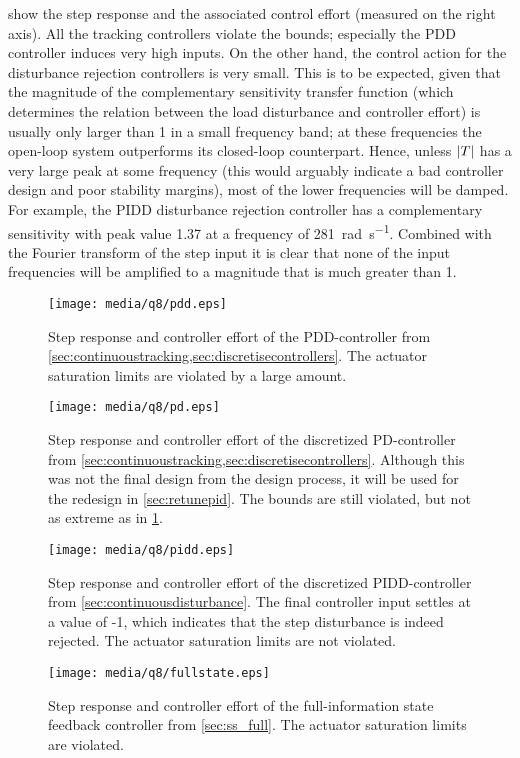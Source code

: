  show the step response and the associated control effort (measured on the right axis). All the tracking controllers violate the bounds; especially the PDD controller induces very high inputs.
On the other hand, the control action for the disturbance rejection controllers is very small. This is to be expected, given that the magnitude of the complementary sensitivity transfer function (which determines the relation between the load disturbance and controller effort) is usually only larger than 1 in a small frequency band; at these frequencies the open-loop system outperforms its closed-loop counterpart. Hence, unless $\abs{T}$ has a very large peak at some frequency (this would arguably indicate a bad controller design and poor stability margins), most of the lower frequencies will be damped. For example, the PIDD disturbance rejection controller has a complementary sensitivity with peak value 1.37 at a frequency of \SI{281}{\radian\per\second}. Combined with the Fourier transform of the step input it is clear that none of the input frequencies will be amplified to a magnitude that is much greater than 1.
\begin{figure}[ht!]
    \centering
    \texttt{[image: media/q8/pdd.eps]}
    \caption{Step response and controller effort of the PDD-controller from \cref{sec:continuoustracking,sec:discretisecontrollers}. The actuator saturation limits are violated by a large amount.}
    \label{fig:q8_pdd}
\end{figure}
\begin{figure}[ht!]
    \centering
    \texttt{[image: media/q8/pd.eps]}
    \caption{Step response and controller effort of the discretized PD-controller from \cref{sec:continuoustracking,sec:discretisecontrollers}. Although this was not the final design from the design process, it will be used for the redesign in \cref{sec:retunepid}. The bounds are still violated, but not as extreme as in \cref{fig:q8_pdd}.}
    \label{fig:q8_pd}
\end{figure}
\begin{figure}[ht!]
    \centering
    \texttt{[image: media/q8/pidd.eps]}
    \caption{Step response and controller effort of the discretized PIDD-controller from \cref{sec:continuousdisturbance}. The final controller input settles at a value of -1, which indicates that the step disturbance is indeed rejected. The actuator saturation limits are not violated.}
    \label{fig:q8_pidd}
\end{figure}
\begin{figure}[ht!]
    \centering
    \texttt{[image: media/q8/fullstate.eps]}
    \caption{Step response and controller effort of the full-information state feedback controller from \cref{sec:ss_full}. The actuator saturation limits are violated.}
    \label{fig:q8_fullstate}
\end{figure}

